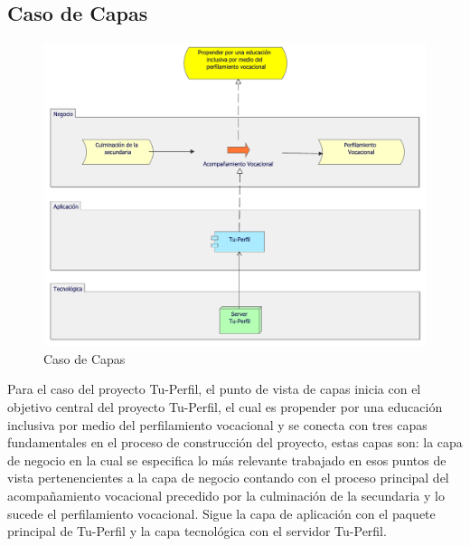 \newpage

\subsection{Caso  de Capas}
\begin{figure}[h!]
	\centering
	\includegraphics[width=.5\linewidth]{imgs/caso/CapasTuPerfil}
	\caption{Caso de Capas}
\end{figure}

Para el caso del proyecto Tu-Perfil, el punto de vista de capas inicia con el objetivo central del proyecto Tu-Perfil, el cual es propender por una educación inclusiva por medio del perfilamiento vocacional y se conecta con tres capas fundamentales en el proceso de construcción del proyecto, estas capas son: la capa de negocio en la cual se especifica lo más relevante trabajado en esos puntos de vista pertenencientes a la capa de negocio contando con el proceso principal del acompañamiento vocacional precedido por la culminación de la secundaria y lo sucede el perfilamiento vocacional. Sigue la capa de aplicación con el paquete principal de Tu-Perfil y la capa tecnológica con el servidor Tu-Perfil.

\clearpage